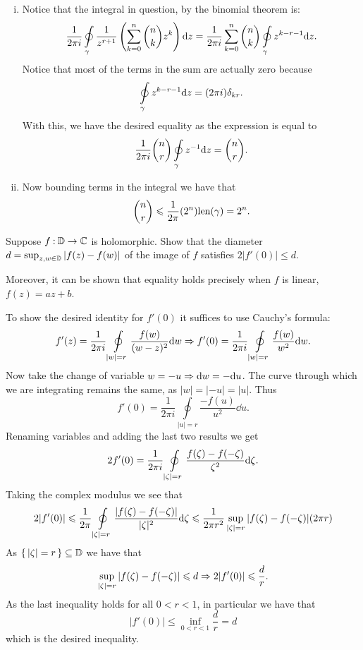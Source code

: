 \documentclass[12pt]{memoir}
\begin{document}
\begin{ptcbr}
    \begin{enumerate}[i)]
        \itemsep=-0.4em
        \item Notice that the integral in question, by the binomial theorem is: 
        $$\frac{1}{2\pi i}\oint\limits_\gamma \frac{1}{z^{r+1}}\left(\sum_{k=0}^{n}\binom{n}{k}z^k\right)\dd z=\frac{1}{2\pi i}\sum_{k=0}^n\binom{n}{k}\oint\limits_{\gamma}z^{k-r-1}\dd z.$$
        Notice that most of the terms in the sum are actually zero because %
        $$\oint\limits_{\gamma}z^{k-r-1}\dd z=(2\pi i)\delta_{kr}.$$
        With this, we have the desired equality as the expression is equal to 
        $$\frac{1}{2\pi i}\binom{n}{r}\oint\limits_{\gamma}z^{-1}\dd z=\binom{n}{r}.$$
        \item Now bounding terms in the integral we have that 
        $$\binom{n}{r}\leqslant\frac{1}{2\pi}(2^n)\text{len}(\gamma)=2^n.$$
    \end{enumerate}
\end{ptcbr}
\begin{Ej}
    Suppose $f\mathbin{:}\mathbb{D}\to\mathbb{C}$ is holomorphic. Show that the diameter $d=\sup_{z,w\in\mathbb{D}}|f(z)-f(w)|$ of the image of $f$ satisfies $2|f'(0)|\leq d$.\par
    Moreover, it can be shown that equality holds precisely when $f$ is linear, $f(z)=az+b$.
\end{Ej}
\begin{ptcbr}
    To show the desired identity for $f'(0)$ it suffices to use Cauchy's formula:
    $$f'(z)=\frac{1}{2\pi i}\oint\limits_{|w|=r}\frac{f(w)}{(w-z)^2}\dd w\Rightarrow f'(0)=\frac{1}{2\pi i}\oint\limits_{|w|=r}\frac{f(w)}{w^2}\dd w.$$
    Now take the change of variable $w=-u\Rightarrow \dd w=-\dd u$. The curve through which we are integrating remains the same, as $|w|=|-u|=|u|$. Thus 
    $$f'(0)=\frac{1}{2\pi i}\oint\limits_{|u|=r}\frac{-f(u)}{u^2}\dd u.$$
    Renaming variables and adding the last two results we get 
    $$2f'(0)=\frac{1}{2\pi i}\oint\limits_{|\zeta|=r}\frac{f(\zeta)-f(-\zeta)}{\zeta^2}\dd\zeta.$$
    Taking the complex modulus we see that 
    $$2|f'(0)|\leqslant\frac{1}{2\pi}\oint\limits_{|\zeta|=r}\frac{|f(\zeta)-f(-\zeta)|}{|\zeta|^2}\dd\zeta\leqslant \frac{1}{2\pi r^2}\sup_{|\zeta|=r}|f(\zeta)-f(-\zeta)|(2\pi r)$$
    As $\{\,|\zeta|=r\,\}\subseteq\mathbb{D}$ we have that 
    $$\sup_{|\zeta|=r}|f(\zeta)-f(-\zeta)|\leqslant d\Rightarrow 2|f'(0)|\leqslant\frac{d}{r}.$$
    As the last inequality holds for all $0<r<1$, in particular we have that 
    $$|f'(0)|\leq\inf_{0<r<1}\frac{d}{r}=d$$
    which is the desired inequality.
\end{ptcbr}
\end{document}
